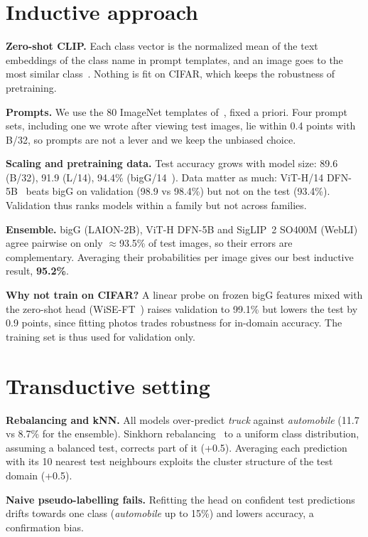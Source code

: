 \documentclass[10pt,twocolumn,letterpaper]{article}
\begin{document}
\section{Inductive approach}
\textbf{Zero-shot CLIP.}
Each class vector is the normalized mean of the text embeddings of the class name in prompt templates, and an image goes to the most similar class~\cite{radford2021learning}.
Nothing is fit on CIFAR, which keeps the robustness of pretraining.

\textbf{Prompts.}
We use the 80 ImageNet templates of~\cite{radford2021learning}, fixed a priori.
Four prompt sets, including one we wrote after viewing test images, lie within 0.4 points with B/32, so prompts are not a lever and we keep the unbiased choice.

\textbf{Scaling and pretraining data.}
Test accuracy grows with model size: 89.6 (B/32), 91.9 (L/14), 94.4\% (bigG/14~\cite{cherti2023reproducible}).
Data matter as much: ViT-H/14 DFN-5B~\cite{fang2023data} beats bigG on validation (98.9 vs 98.4\%) but not on the test (93.4\%).
Validation thus ranks models within a family but not across families.

\textbf{Ensemble.}
bigG (LAION-2B), ViT-H DFN-5B and SigLIP~2 SO400M (WebLI)~\cite{tschannen2025siglip} agree pairwise on only $\approx$93.5\% of test images, so their errors are complementary.
Averaging their probabilities per image gives our best inductive result, \textbf{95.2\%}.

\textbf{Why not train on CIFAR?}
A linear probe on frozen bigG features mixed with the zero-shot head (WiSE-FT~\cite{wortsman2022robust}) raises validation to 99.1\% but lowers the test by 0.9 points, since fitting photos trades robustness for in-domain accuracy.
The training set is thus used for validation only.

\section{Transductive setting}
\textbf{Rebalancing and kNN.}
All models over-predict \emph{truck} against \emph{automobile} (11.7 vs 8.7\% for the ensemble).
Sinkhorn rebalancing~\cite{cuturi2013sinkhorn} to a uniform class distribution, assuming a balanced test, corrects part of it (+0.5).
Averaging each prediction with its 10 nearest test neighbours exploits the cluster structure of the test domain (+0.5).

\textbf{Naive pseudo-labelling fails.}
Refitting the head on confident test predictions drifts towards one class (\emph{automobile} up to 15\%) and lowers accuracy, a confirmation bias.
\end{document}
